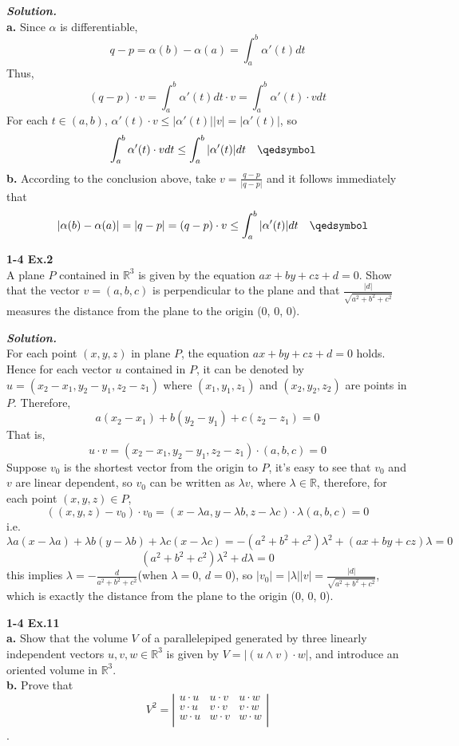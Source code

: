 \documentclass{article}
\begin{document}
\par
\textbf{\textit{Solution.}}\\
\textbf{a. } Since $\alpha$ is differentiable,
$$
    q - p = \alpha(b) - \alpha(a) = \int_a^b \alpha'(t)dt
$$
Thus,
$$
    (q - p) \cdot v = \int_a^b \alpha'(t) dt \cdot v = \int_a^b \alpha'(t) \cdot vdt
$$
For each $t \in (a, b)$, $\alpha'(t) \cdot v \leq |\alpha'(t)||v| = |\alpha'(t)|$, so
$$
    \quad \int_a^b \alpha'(t) \cdot vdt \leq \int_a^b |\alpha'(t)|dt \quad \qedsymbol
$$
\textbf{b. } According to the conclusion above, take $v = \frac{q - p}{|q - p|}$ and
it follows immediately that
$$
    \quad |\alpha(b) - \alpha(a)| = |q - p| = (q - p) \cdot v \leq \int_a^b |\alpha'(t)|dt \quad \qedsymbol
$$

\par
\textbf{1-4 Ex.2}\\
A plane $P$ contained in $\mathbb{R}^3$ is given by the equation $ax+by+cz+d=0$. Show that the vector $v=(a,b,c)$
is perpendicular to the plane and that $\frac{|d|}{\sqrt{a^2+b^2+c^2}}$ measures the distance from the plane to the origin
(0, 0, 0).

\par
\textbf{\textit{Solution.}}\\
For each point $(x, y, z)$ in plane $P$, the equation $ax+by+cz+d=0$ holds. Hence for each vector $u$ contained in $P$,
it can be denoted by $u = (x_2-x_1, y_2-y_1, z_2-z_1)$ where $(x_1, y_1, z_1)$ and $(x_2, y_2, z_2)$ are points in $P$.
Therefore,
$$
    a(x_2-x_1) + b(y_2-y_1) + c(z_2-z_1) = 0
$$
That is,
$$
    u \cdot v = (x_2-x_1, y_2-y_1, z_2-z_1) \cdot (a,b,c) = 0
$$
Suppose $v_0$ is the shortest vector from the origin to $P$, it's easy to see that $v_0$ and $v$ are linear dependent, so
$v_0$ can be written as $\lambda v$, where $\lambda \in \mathbb{R}$, therefore, for each point $(x,y,z) \in P$, 
$$
    ((x,y,z) - v_0) \cdot v_0 = (x-\lambda a, y-\lambda b, z-\lambda c) \cdot \lambda (a,b,c) = 0
$$
i.e.
$$
    \lambda a(x-\lambda a) + \lambda b(y-\lambda b) + \lambda c(x-\lambda c) = -(a^2+b^2+c^2)\lambda^2 + (ax+by+cz)\lambda = 0
$$
$$
    (a^2+b^2+c^2)\lambda^2 + d\lambda = 0
$$
this implies $\lambda=-\frac{d}{a^2+b^2+c^2}$(when $\lambda = 0$, $d = 0$), so $|v_0| = |\lambda||v| = \frac{|d|}{\sqrt{a^2+b^2+c^2}}$,
which is exactly the distance from the plane to the origin (0, 0, 0).

\par
\textbf{1-4 Ex.11}\\
\textbf{a. }Show that the volume $V$ of a parallelepiped generated by three linearly independent vectors $u,v,w \in \mathbb{R}^3$ is
given by $V = |(u \wedge v) \cdot w|$, and introduce an oriented volume in $\mathbb{R}^3$.\\
\textbf{b. }Prove that
$$
    V^2 = 
    \left|\begin{array}{ccc} 
        u \cdot u & u \cdot v & u \cdot w \\ 
        v \cdot u & v \cdot v & v \cdot w \\ 
        w \cdot u & w \cdot v & w \cdot w \\ 
    \end{array}\right|
$$.
\end{document}

